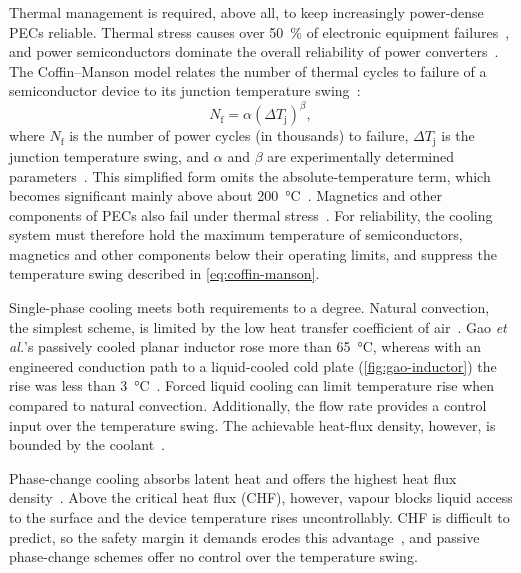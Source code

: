 Thermal management is required, above all, to keep increasingly power-dense
PECs reliable. Thermal stress causes over \SI{50}{\percent} of electronic
equipment failures~\cite{rahman_emerging_2024}, and power semiconductors
dominate the overall reliability of power converters~\cite{kalay_systematic_2025}. The
Coffin--Manson model relates the number of thermal cycles to failure of a
semiconductor device to its junction temperature
swing~\cite{kalay_systematic_2025,albarbar_thermal_2018}:
\begin{equation}
  N_{\mathrm{f}} = \alpha \left(\Delta T_{\mathrm{j}}\right)^{\beta},
  \label{eq:coffin-manson}
\end{equation}
where $N_{\mathrm{f}}$ is the number of power cycles (in thousands) to failure,
$\Delta T_{\mathrm{j}}$ is the junction temperature swing, and $\alpha$ and
$\beta$ are experimentally determined parameters~\cite{kalay_systematic_2025}.
This simplified form omits the absolute-temperature term, which becomes
significant mainly above about \SI{200}{\celsius}~\cite{kalay_systematic_2025}.
Magnetics and other components of PECs also fail under thermal
stress~\cite{biela_cooling_2007,mengesha_advanced_2025,li_review_2022,lawton_power_2024, rahman_emerging_2024}.
For reliability, the cooling system must therefore hold the maximum temperature
of semiconductors, magnetics and other components below their operating limits,
and suppress the temperature swing described in \cref{eq:coffin-manson}.

Single-phase cooling meets both requirements to a degree. Natural convection,
the simplest scheme, is limited by the low heat transfer coefficient of
air~\cite{biela_cooling_2007}. Gao \emph{et al.}'s passively cooled
planar inductor rose more than \SI{65}{\celsius}, whereas with an engineered conduction path to a
liquid-cooled cold plate (\cref{fig:gao-inductor}) the rise was less than
\SI{3}{\celsius}~\cite{gao_modeling_2022}. Forced liquid cooling can limit temperature rise when compared to natural convection. 
Additionally, the flow rate provides a control
input over the temperature swing. The achievable heat-flux density, however, is bounded by the
coolant~\cite{rahman_emerging_2024,laloya_heat_2016}. 

Phase-change cooling absorbs latent heat and offers the highest heat
flux density~\cite{laloya_heat_2016,mudawar_assessment_2001}. Above the critical heat
flux (CHF), however, vapour blocks liquid access to the surface and the device
temperature rises uncontrollably. CHF is difficult to predict, so the safety
margin it demands erodes this advantage~\cite{mudawar_assessment_2001}, and
passive phase-change schemes offer no control over the temperature swing.

